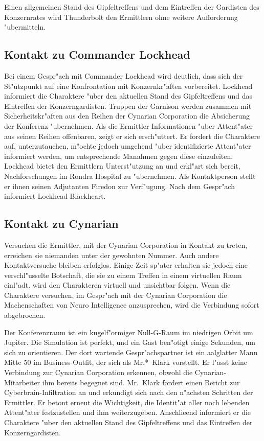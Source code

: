 Einen allgemeinen Stand des Gipfeltreffens und dem Eintreffen der Gardisten des Konzernrates wird Thunderbolt den Ermittlern ohne weitere Aufforderung "ubermitteln.

\subsection{Kontakt zu Commander Lockhead} 
Bei einem Gespr"ach mit Commander Lockhead wird deutlich, dass sich der St"utzpunkt auf eine Konfrontation mit Konzernkr"aften vorbereitet. Lockhead informiert die Charaktere "uber den aktuellen Stand des Gipfeltreffens und das Eintreffen der Konzerngardisten. Truppen der Garnison werden zusammen mit Sicherheitskr"aften aus den Reihen der Cynarian Corporation die Absicherung der Konferenz "ubernehmen. Als die Ermittler Informationen "uber Attent"ater aus seinen Reihen offenbaren, zeigt er sich ersch"uttert. Er fordert die Charaktere auf, unterzutauchen, m"ochte jedoch umgehend "uber identifizierte Attent"ater informiert werden, um entsprechende Ma\3nahmen gegen diese einzuleiten. Lockhead bietet den Ermittlern Unterst"utzung an und erkl"art sich bereit, Nachforschungen im Rondra Hospital zu "ubernehmen. Als Kontaktperson stellt er ihnen seinen Adjutanten Firedon zur Verf"ugung. Nach dem Gespr"ach informiert Lockhead Blackheart.

\subsection{Kontakt zu Cynarian} 
Versuchen die Ermittler, mit der Cynarian Corporation in Kontakt zu treten, erreichen sie niemanden unter der gewohnten Nummer. Auch andere Kontaktversuche bleiben erfolglos. Einige Zeit sp"ater erhalten sie jedoch eine verschl"usselte Botschaft, die sie zu einem Treffen in einem virtuellen Raum einl"adt. \xl{} wird den Charakteren virtuell und unsichtbar folgen. Wenn die Charaktere versuchen, im Gespr"ach mit der Cynarian Corporation die Machenschaften von Neuro Intelligence anzusprechen, wird die Verbindung sofort abgebrochen.

Der Konferenzraum ist ein kugelf"ormiger Null-G-Raum im niedrigen Orbit um Jupiter. Die Simulation ist perfekt, und ein Gast ben"otigt einige Sekunden, um sich zu orientieren. Der dort wartende Gespr"achspartner ist ein aalglatter Mann Mitte 50 im Business-Outfit, der sich als Mr.*~Klark vorstellt. Er l"asst keine Verbindung zur Cynarian Corporation erkennen, obwohl die Cynarian-Mitarbeiter ihm bereits begegnet sind. Mr.~Klark fordert einen Bericht zur Cyberbrain-Infiltration an und erkundigt sich nach den n"achsten Schritten der Ermittler. Er betont erneut die Wichtigkeit, die Identit"at aller noch lebenden Attent"ater festzustellen und ihm weiterzugeben. Anschlie\3end informiert er die Charaktere "uber den aktuellen Stand des Gipfeltreffens und das Eintreffen der Konzerngardisten.

